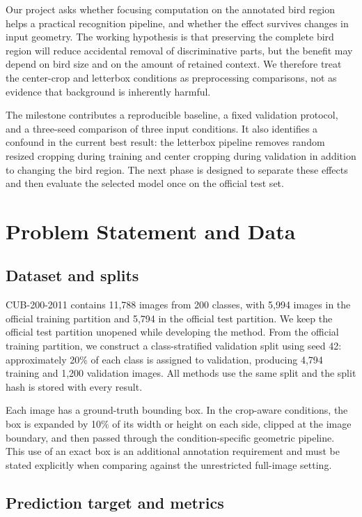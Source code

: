 \documentclass[10pt,twocolumn,letterpaper]{article}
\begin{document}
Our project asks whether focusing computation on the annotated bird region
helps a practical recognition pipeline, and whether the effect survives
changes in input geometry. The working hypothesis is that preserving the
complete bird region will reduce accidental removal of discriminative
parts, but the benefit may depend on bird size and on the amount of retained
context. We therefore treat the center-crop and letterbox conditions as
preprocessing comparisons, not as evidence that background is inherently
harmful.

The milestone contributes a reproducible baseline, a fixed validation protocol,
and a three-seed comparison of three input conditions. It also identifies a
confound in the current best result: the letterbox pipeline removes random
resized cropping during training and center cropping during validation in
addition to changing the bird region. The next phase is designed to separate
these effects and then evaluate the selected model once on the official test
set.

\section{Problem Statement and Data}

\subsection{Dataset and splits}

CUB-200-2011 contains 11,788 images from 200 classes, with 5,994 images in the
official training partition and 5,794 in the official test partition. We keep
the official test partition unopened while developing the method. From the
official training partition, we construct a class-stratified validation split
using seed 42: approximately 20\% of each class is assigned to validation,
producing 4,794 training and 1,200 validation images. All methods use the same
split and the split hash is stored with every result.

Each image has a ground-truth bounding box. In the crop-aware conditions, the
box is expanded by 10\% of its width or height on each side, clipped at the
image boundary, and then passed through the condition-specific geometric
pipeline. This use of an exact box is an additional annotation requirement and
must be stated explicitly when comparing against the unrestricted full-image
setting.

\subsection{Prediction target and metrics}
\end{document}
